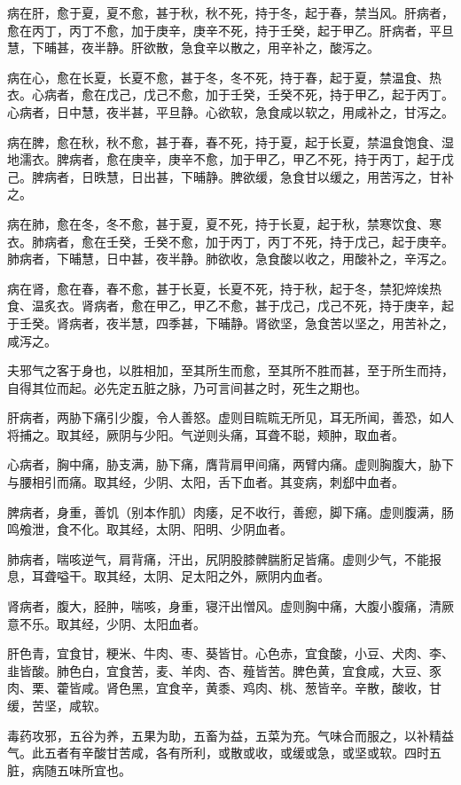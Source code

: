 \documentclass{article}%
\begin{document}
病在肝，愈于夏，夏不愈，甚于秋，秋不死，持于冬，起于春，禁当风。肝病者，愈在丙丁，丙丁不愈，加于庚辛，庚辛不死，持于壬癸，起于甲乙。肝病者，平旦慧，下晡甚，夜半静。肝欲散，急食辛以散之，用辛补之，酸泻之。

病在心，愈在长夏，长夏不愈，甚于冬，冬不死，持于春，起于夏，禁温食、热衣。心病者，愈在戊己，戊己不愈，加于壬癸，壬癸不死，持于甲乙，起于丙丁。心病者，日中慧，夜半甚，平旦静。心欲软，急食咸以软之，用咸补之，甘泻之。

病在脾，愈在秋，秋不愈，甚于春，春不死，持于夏，起于长夏，禁温食饱食、湿地濡衣。脾病者，愈在庚辛，庚辛不愈，加于甲乙，甲乙不死，持于丙丁，起于戊己。脾病者，日昳慧，日出甚，下晡静。脾欲缓，急食甘以缓之，用苦泻之，甘补之。

病在肺，愈在冬，冬不愈，甚于夏，夏不死，持于长夏，起于秋，禁寒饮食、寒衣。肺病者，愈在壬癸，壬癸不愈，加于丙丁，丙丁不死，持于戊己，起于庚辛。肺病者，下晡慧，日中甚，夜半静。肺欲收，急食酸以收之，用酸补之，辛泻之。

病在肾，愈在春，春不愈，甚于长夏，长夏不死，持于秋，起于冬，禁犯焠㶼热食、温炙衣。肾病者，愈在甲乙，甲乙不愈，甚于戊己，戊己不死，持于庚辛，起于壬癸。肾病者，夜半慧，四季甚，下晡静。肾欲坚，急食苦以坚之，用苦补之，咸泻之。

夫邪气之客于身也，以胜相加，至其所生而愈，至其所不胜而甚，至于所生而持，自得其位而起。必先定五脏之脉，乃可言间甚之时，死生之期也。

肝病者，两胁下痛引少腹，令人善怒。虚则目䀮䀮无所见，耳无所闻，善恐，如人将捕之。取其经，厥阴与少阳。气逆则头痛，耳聋不聪，颊肿，取血者。

心病者，胸中痛，胁支满，胁下痛，膺背肩甲间痛，两臂内痛。虚则胸腹大，胁下与腰相引而痛。取其经，少阴、太阳，舌下血者。其变病，刺郄中血者。

脾病者，身重，善饥（别本作肌）肉痿，足不收行，善瘛，脚下痛。虚则腹满，肠鸣飧泄，食不化。取其经，太阴、阳明、少阴血者。

肺病者，喘咳逆气，肩背痛，汗出，尻阴股膝髀腨胻足皆痛。虚则少气，不能报息，耳聋嗌干。取其经，太阴、足太阳之外，厥阴内血者。

肾病者，腹大，胫肿，喘咳，身重，寝汗出憎风。虚则胸中痛，大腹小腹痛，清厥意不乐。取其经，少阴、太阳血者。

肝色青，宜食甘，粳米、牛肉、枣、葵皆甘。心色赤，宜食酸，小豆、犬肉、李、韭皆酸。肺色白，宜食苦，麦、羊肉、杏、薤皆苦。脾色黄，宜食咸，大豆、豕肉、栗、藿皆咸。肾色黑，宜食辛，黄黍、鸡肉、桃、葱皆辛。辛散，酸收，甘缓，苦坚，咸软。

毒药攻邪，五谷为养，五果为助，五畜为益，五菜为充。气味合而服之，以补精益气。此五者有辛酸甘苦咸，各有所利，或散或收，或缓或急，或坚或软。四时五脏，病随五味所宜也。
\end{document}
